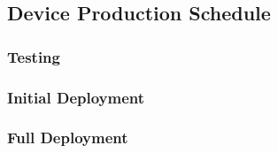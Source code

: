 \subsection{Device Production Schedule}
\subsubsection{Testing}
\subsubsection{Initial Deployment}
\subsubsection{Full Deployment}
